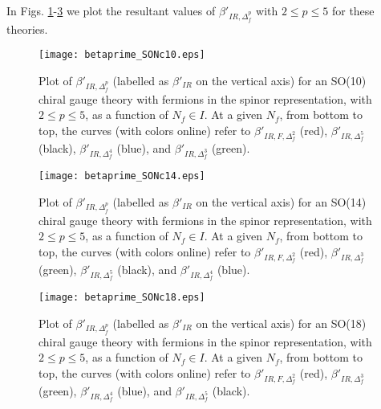\documentclass[prd,twocolumn,nofootinbib,amsfonts,amssymb]{revtex4}
\begin{document}
%

In Figs. \ref{betaprime_SO10_plot}-\ref{betaprime_SO18_plot} we plot the
resultant values of $\beta'_{IR,\Delta_f^p}$ with $2 \le p \le 5$ for these
theories. 

\begin{figure}
  \begin{center}
    \texttt{[image: betaprime\_SONc10.eps]}
  \end{center}
  \caption{Plot of $\beta'_{IR,\Delta_f^p}$ (labelled as
    $\beta'_{IR}$ on the vertical axis) for an SO(10) chiral gauge theory
    with fermions in the spinor representation, with $2 \le p \le 5$, 
    as a function of $N_f \in I$. At a given $N_f$, from bottom to top, the 
    curves (with colors online) refer to $\beta'_{IR,F,\Delta_f^2}$ (red),
    $\beta'_{IR,\Delta_f^5}$ (black), $\beta'_{IR,\Delta_f^4}$ (blue), and 
    $\beta'_{IR,\Delta_f^3}$ (green).}
\label{betaprime_SO10_plot}
\end{figure} 

\begin{figure}
  \begin{center}
    \texttt{[image: betaprime\_SONc14.eps]}
  \end{center}
  \caption{Plot of $\beta'_{IR,\Delta_f^p}$ (labelled as
    $\beta'_{IR}$ on the vertical axis) for an SO(14) chiral gauge theory
    with fermions in the spinor representation, with $2 \le p \le 5$, 
    as a function of $N_f \in I$. At a given $N_f$, from bottom to top, the 
    curves (with colors online) refer to $\beta'_{IR,F,\Delta_f^2}$ (red),
    $\beta'_{IR,\Delta_f^3}$ (green), $\beta'_{IR,\Delta_f^5}$ (black), and
    $\beta'_{IR,\Delta_f^4}$ (blue).}
\label{betaprime_SO14_plot}
\end{figure} 


\begin{figure}
  \begin{center}
    \texttt{[image: betaprime\_SONc18.eps]}
  \end{center}
  \caption{Plot of $\beta'_{IR,\Delta_f^p}$ (labelled as
    $\beta'_{IR}$ on the vertical axis) for an SO(18) chiral gauge theory
    with fermions in the spinor representation, with $2 \le p \le 5$, 
    as a function of $N_f \in I$. At a given $N_f$, from bottom to top, the 
    curves (with colors online) refer to $\beta'_{IR,F,\Delta_f^2}$ (red),
    $\beta'_{IR,\Delta_f^3}$ (green), $\beta'_{IR,\Delta_f^4}$ (blue), and 
    $\beta'_{IR,\Delta_f^5}$ (black).}
\label{betaprime_SO18_plot}
\end{figure} 
\end{document}
